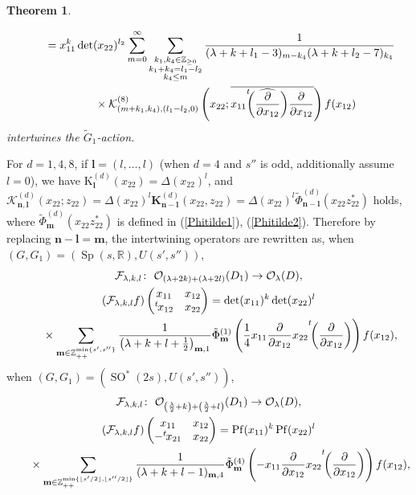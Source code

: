 \documentclass[pdftex]{sigma}
\numberwithin{equation}{section}
\newtheorem{Theorem}{Theorem}[section]
\newcommand{\bK}{\mathbf{K}}
\newcommand{\bl}{\mathbf{l}}
\newcommand{\bm}{\mathbf{m}}
\newcommand{\bn}{\mathbf{n}}
\newcommand{\BZ}{\mathbb{Z}}
\newcommand{\BR}{\mathbb{R}}
\newcommand{\cF}{\mathcal{F}}
\newcommand{\cK}{\mathcal{K}}
\newcommand{\cO}{\mathcal{O}}
\newcommand{\rK}{\mathrm{K}}
\newcommand{\Pf}{\operatorname{Pf}}
\begin{document}
\begin{Theorem}
\begin{enumerate}
\begin{gather*}
\qquad{} =x_{11}^k\det(x_{22})^{l_2}\sum_{m=0}^\infty \sum_{\substack{k_1,k_4\in\BZ_{\ge 0}\\ k_1+k_4=l_1-l_2\\ k_4\le m}}
\frac{1}{(\lambda+k+l_1-3)_{m-k_4}(\lambda+k+l_2-7)_{k_4}}\\
\qquad\quad {}\times \cK_{(m+k_1,k_4),(l_1-l_2,0)}^{(8)}
\left(x_{22};\overline{x_{11}{\vphantom{\biggl(}}^t\!\!\biggl(\widehat{\frac{\partial}{\partial x_{12}}}\biggr)
\frac{\partial}{\partial x_{12}}}\right)f(x_{12})
\end{gather*}
intertwines the $\tilde{G}_1$-action.
\end{enumerate}
\end{Theorem}
For $d=1,4,8$, if $\bl=(l,\ldots,l)$ (when $d=4$ and $s''$ is odd, additionally assume $l=0$), we have $\rK_\bl^{(d)}(x_{22})=\Delta(x_{22})^l$,
and $\cK_{\bn,\bl}^{(d)}(x_{22};z_{22})=\Delta(x_{22})^l\bK_{\bn-\bl}^{(d)}(x_{22},z_{22})
=\Delta(x_{22})^l\tilde{\Phi}_{\bn-\bl}^{(d)}(x_{22}z_{22}^*)$ holds,
where $\tilde{\Phi}_\bm^{(d)}(x_{22}z_{22}^*)$ is defined in (\ref{Phitilde1}), (\ref{Phitilde2}).
Therefore by replacing $\bn-\bl=\bm$, the intertwining operators are rewritten as, when $(G,G_1)=(\operatorname{Sp}(s,\BR), U(s',s''))$,
\begin{gather}
\cF_{\lambda,k,l}\colon \ \cO_{(\lambda+2k)+(\lambda+2l)}(D_1)\to \cO_\lambda(D),\notag \\
(\cF_{\lambda,k,l}f)\begin{pmatrix}x_{11}&x_{12}\\{}^t\hspace{-1pt}x_{12}&x_{22}\end{pmatrix}=\det(x_{11})^k\det(x_{22})^l\nonumber\\
\qquad{} \times\sum_{\bm\in\BZ_{++}^{\min\{s',s''\}}}
\frac{1}{\left(\lambda+k+l+\frac{1}{2}\right)_{\bm,1}}\tilde{\Phi}_\bm^{(1)}
\left(\frac{1}{4}x_{11}\frac{\partial}{\partial x_{12}}x_{22}{\vphantom{\biggl(}}^t\!\!\left(\frac{\partial}{\partial x_{12}}\right)\right)
f(x_{12}),\label{Sp-U}
\end{gather}
when $(G,G_1)=(\operatorname{SO}^*(2s), U(s',s''))$,
\begin{gather}
\cF_{\lambda,k,l}\colon \ \cO_{\left(\frac{\lambda}{2}+k\right)+\left(\frac{\lambda}{2}+l\right)}(D_1)\to \cO_\lambda(D), \notag \\
(\cF_{\lambda,k,l}f)\begin{pmatrix}x_{11}&x_{12}\\-{}^t\hspace{-1pt}x_{21}&x_{22}\end{pmatrix}
=\Pf(x_{11})^k\Pf(x_{22})^l\notag\\
\qquad{} \times\sum_{\bm\in\BZ_{++}^{\min\{\lfloor s'/2\rfloor,\lfloor s''/2\rfloor\}}}
\frac{1}{(\lambda+k+l-1)_{\bm,4}}\tilde{\Phi}_\bm^{(4)}
\left(-x_{11}\frac{\partial}{\partial x_{12}}x_{22}{\vphantom{\biggl(}}^t\!\!\left(\frac{\partial}{\partial x_{12}}\right)\right)f(x_{12}),\label{SO*-U}
\end{gather}
\end{document}
